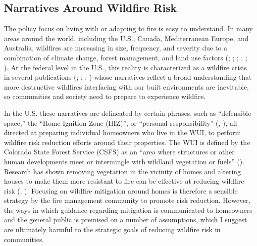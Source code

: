 \documentclass[
]{article}
\begin{document}
\subsection{Narratives Around Wildfire Risk}\label{narratives-around-wildfire-risk}

The policy focus on living with or adapting to fire is easy to understand. In many areas around the world, including the U.S., Canada, Mediterranean Europe, and Australia, wildfires are increasing in size, frequency, and severity due to a combination of climate change, forest management, and land use factors (; ; ; ; ; ). At the federal level in the U.S., this reality is characterized as a wildfire crisis in several publications (; ; ; ) whose narratives reflect a broad understanding that more destructive wildfires interfacing with our built environments are inevitable, so communities and society need to prepare to experience wildfire.

In the U.S. these narratives are delineated by certain phrases, such as ``defensible space,'' the ``Home Ignition Zone (HIZ)'', or ``personal responsibility'' (, ), all directed at preparing individual homeowners who live in the WUI, to perform wildfire risk reduction efforts around their properties. The WUI is defined by the Colorado State Forest Service (CSFS) as an ``area where structures or other human developments meet or intermingle with wildland vegetation or fuels'' (). Research has shown removing vegetation in the vicinity of homes and altering houses to make them more resistant to fire can be effective at reducing wildfire risk (; ). Focusing on wildfire mitigation around homes is therefore a sensible strategy by the fire management community to promote risk reduction. However, the ways in which guidance regarding mitigation is communicated to homeowners and the general public is premised on a number of assumptions, which I suggest are ultimately harmful to the strategic goals of reducing wildfire risk in communities.
\end{document}
